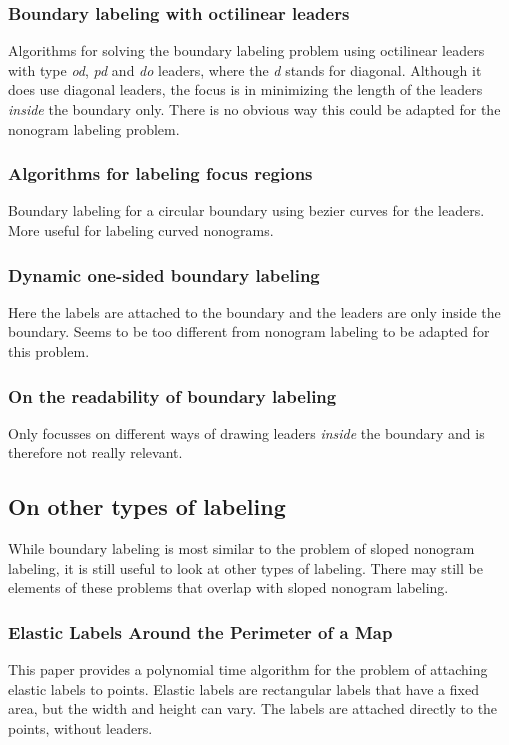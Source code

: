 \documentclass[a4paper]{article}
\begin{document}
\subsubsection{Boundary labeling with octilinear leaders \cite{bekos2010boundary}}
Algorithms for solving the boundary labeling problem using octilinear leaders with type \emph{od}, \emph{pd} and \emph{do} leaders, where the \emph{d} stands for diagonal. Although it does use diagonal leaders, the focus is in minimizing the length of the leaders \emph{inside} the boundary only. There is no obvious way this could be adapted for the nonogram labeling problem.

\subsubsection{Algorithms for labeling focus regions \cite{fink2012algorithms}}
Boundary labeling for a circular boundary using bezier curves for the leaders. More useful for labeling curved nonograms.

\subsubsection{Dynamic one-sided boundary labeling \cite{nollenburg2010dynamic}}
Here the labels are attached to the boundary and the leaders are only inside the boundary. Seems to be too different from nonogram labeling to be adapted for this problem.


\subsubsection{On the readability of boundary labeling \cite{barth2015readability}}
Only focusses on different ways of drawing leaders \textit{inside} the boundary and is therefore not really relevant.

\subsection{On other types of labeling}
While boundary labeling is most similar to the problem of sloped nonogram labeling, it is still useful to look at other types of labeling. There may still be elements of these problems that overlap with sloped nonogram labeling.

\subsubsection{Elastic Labels Around the Perimeter of a Map \cite{iturriaga1999elastic}}
This paper provides a polynomial time algorithm for the problem of attaching elastic labels to points. Elastic labels are rectangular labels that have a fixed area, but the width and height can vary. The labels are attached directly to the points, without leaders.
\end{document}
